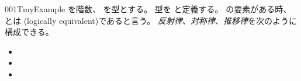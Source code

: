 \documentclass[index]{subfiles}
\begin{document}
\begin{myBlock}{001T}{myExample}
  を階数、
  を型とする。
  型を
  と定義する。
  の要素がある時、
  とは
  (logically equivalent)であると言う。
  \emph{反射律}、\emph{対称律}、\emph{推移律}を次のように構成できる。
  \begin{itemize}
  \item {}
  \item {}
  \item {}
  \end{itemize}
\end{myBlock}
\end{document}
